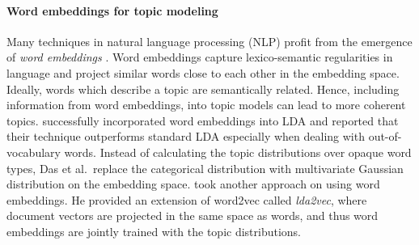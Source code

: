 \paragraph{Word embeddings for topic modeling} Many techniques in natural language processing (NLP) profit from the emergence of \textit{word embeddings} \citep{mikolovdistributed2013,bengioneural2003}. Word embeddings capture lexico-semantic regularities in language and project similar words close to each other in the embedding space. Ideally, words which describe a topic are semantically related. Hence, including information from word embeddings, into topic models can lead to more coherent topics. \citet{dasgaussian2015} successfully incorporated word embeddings into LDA and reported that their technique outperforms standard LDA especially when dealing with out-of-vocabulary words. Instead of calculating the topic distributions over opaque word types, Das et al.~replace the categorical distribution with multivariate Gaussian distribution on the embedding space. \citet{Moody16} took another approach on using word embeddings. He provided an extension of word2vec called \textit{lda2vec}, where document vectors are projected in the same space as words, and thus word embeddings are jointly trained with the topic distributions.

